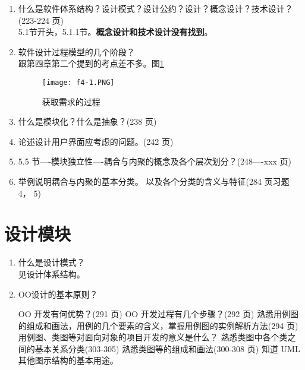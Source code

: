 \documentclass[14pt, letterpaper, UTF8, fontset=windowsnew, heading=true]{article}
\begin{document}
\begin{enumerate}
	\item 什么是软件体系结构？设计模式？设计公约？设计？概念设计？技术设计？(223-224
	页) \\
	5.1节开头，5.1.1节。\textbf{概念设计和技术设计没有找到}。
	
	\item 软件设计过程模型的几个阶段？ \\
	跟第四章第二个提到的考点差不多。图\ref{fig:proceduredesignmodel}
	\begin{figure}[h]
		\centering
		\texttt{[image: f4-1.PNG]}
		\caption{获取需求的过程}
		\label{fig:proceduredesignmodel}
	\end{figure}
	
	
	\item 什么是模块化？什么是抽象？(238 页) \\
	
	\item 论述设计用户界面应考虑的问题。(242 页) \\
	
	\item 5.5 节----模块独立性----耦合与内聚的概念及各个层次划分？(248----xxx 页) \\
	
	\item 举例说明耦合与内聚的基本分类。 以及各个分类的含义与特征(284 页习题 4， 5) \\
\end{enumerate}

\section{设计模块}

\begin{enumerate}

	\item 什么是设计模式？ \\
	见设计体系结构。
	
	\item OO设计的基本原则？
	
	OO 开发有何优势？(291 页)
	OO 开发过程有几个步骤？(292 页)
	熟悉用例图的组成和画法，用例的几个要素的含义，掌握用例图的实例解析方法(294
	页)
	用例图、类图等对面向对象的项目开发的意义是什么？
	熟悉类图中各个类之间的基本关系分类(303-305)
	熟悉类图等的组成和画法(300-308 页)
	知道 UML 其他图示结构的基本用途。
\end{enumerate}
\end{document}
